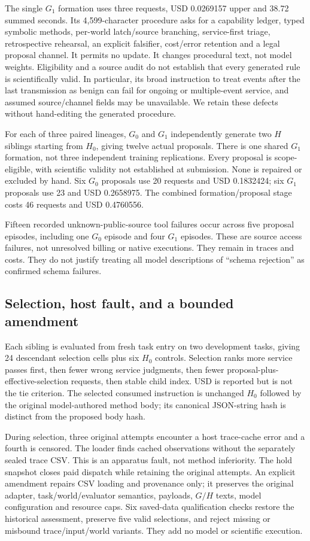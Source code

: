 The single $G_1$ formation uses three requests, USD 0.0269157 upper and 38.72
summed seconds. Its 4,599-character procedure asks for a capability ledger,
typed symbolic methods, per-world latch/source branching, service-first triage,
retrospective rehearsal, an explicit falsifier, cost/error retention and a
legal proposal channel. It permits no update. It changes procedural text,
not model weights. Eligibility and a source audit do not establish that every
generated rule is scientifically valid. In particular, its broad instruction
to treat events after the last transmission as benign can fail for ongoing or
multiple-event service, and assumed source/channel fields may be unavailable.
We retain these defects without hand-editing the generated procedure.

For each of three paired lineages, $G_0$ and $G_1$ independently generate two
$H$ siblings starting from $H_0$, giving twelve actual proposals. There is one
shared $G_1$ formation, not three independent training replications. Every
proposal is scope-eligible, with scientific validity not established at
submission. None is repaired or excluded by hand. Six $G_0$ proposals use
20 requests and USD 0.1832424; six $G_1$ proposals use 23 and USD 0.2658975.
The combined formation/proposal stage costs 46 requests and USD 0.4760556.

Fifteen recorded unknown-public-source tool failures occur across five proposal
episodes, including one $G_0$ episode and four $G_1$ episodes. These are source
access failures, not unresolved billing or native executions. They remain in
traces and costs. They do not justify treating all model descriptions of
``schema rejection'' as confirmed schema failures.

\subsection{Selection, host fault, and a bounded amendment}
Each sibling is evaluated from fresh task entry on two development tasks,
giving 24 descendant selection cells plus six $H_0$ controls. Selection ranks
more service passes first, then fewer wrong service judgments, then fewer
proposal-plus-effective-selection requests, then stable child index. USD is
reported but is not the tie criterion. The selected consumed instruction is
unchanged $H_0$ followed by the original model-authored method body; its
canonical JSON-string hash is distinct from the proposed body hash.

During selection, three original attempts encounter a host trace-cache error
and a fourth is censored. The loader finds cached observations without the
separately sealed trace CSV. This is an apparatus fault, not method inferiority.
The hold snapshot closes paid dispatch while retaining the original attempts.
An explicit amendment repairs CSV loading and provenance only; it preserves
the original adapter, task/world/evaluator semantics, payloads, $G/H$ texts,
model configuration and resource caps. Six saved-data qualification checks
restore the historical assessment, preserve five valid selections, and reject
missing or misbound trace/input/world variants. They add no model or scientific
execution.

